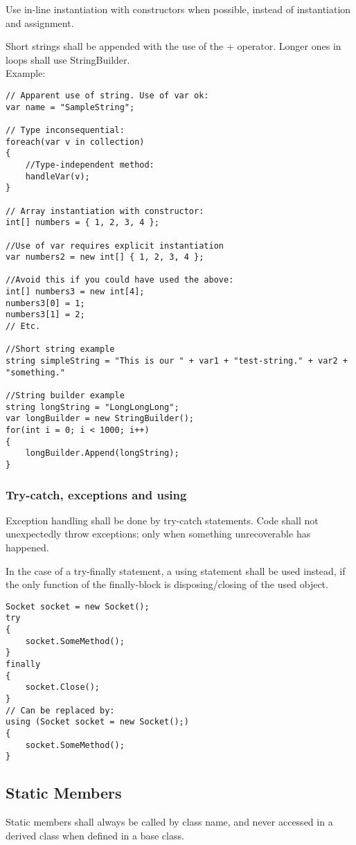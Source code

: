 \documentclass[12pt, a4paper]{article}
\begin{document}
Use in-line instantiation with constructors when possible, instead of instantiation and assignment.

Short strings shall be appended with the use of the + operator. Longer ones in loops shall use StringBuilder.\\

Example:
\begin{lstlisting}
// Apparent use of string. Use of var ok:
var name = "SampleString";

// Type inconsequential:
foreach(var v in collection)
{
	//Type-independent method:
	handleVar(v);
}

// Array instantiation with constructor:
int[] numbers = { 1, 2, 3, 4 };

//Use of var requires explicit instantiation
var numbers2 = new int[] { 1, 2, 3, 4 };

//Avoid this if you could have used the above:
int[] numbers3 = new int[4];
numbers3[0] = 1;
numbers3[1] = 2;
// Etc.

//Short string example
string simpleString = "This is our " + var1 + "test-string." + var2 + "something."

//String builder example
string longString = "LongLongLong";
var longBuilder = new StringBuilder();
for(int i = 0; i < 1000; i++)
{
	longBuilder.Append(longString);
}

\end{lstlisting}


\subsubsection{Try-catch, exceptions and using}
Exception handling shall be done by try-catch statements.
Code shall not unexpectedly throw exceptions; only when something unrecoverable has happened.

In the case of a try-finally statement, a using statement shall be used instead, if the only function of
the finally-block is disposing/closing of the used object.
\\
\begin{lstlisting}
Socket socket = new Socket();
try
{
	socket.SomeMethod();
}
finally
{
	socket.Close();
}
// Can be replaced by:
using (Socket socket = new Socket();)
{
	socket.SomeMethod();
}
\end{lstlisting}

\subsection{Static Members}
Static members shall always be called by class name, and never accessed in a derived class when defined in a base class.
\end{document}
